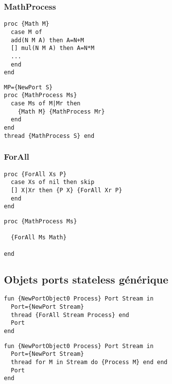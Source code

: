 \documentclass{report}
\begin{document}
\subsubsection*{MathProcess}
\begin{minipage}[t]{0.45\linewidth}
\begin{lstlisting}[escapechar=\%]
proc {Math M} 
  case M of 
  add(N M A) then A=N+M 
  [] mul(N M A) then A=N*M 
  ... 
  end
end
\end{lstlisting} 
\end{minipage}
%
\begin{minipage}[t]{0.45\linewidth}
\begin{lstlisting}[escapechar=\%]
MP={NewPort S} 
proc {MathProcess Ms} 
  case Ms of M|Mr then 
    {Math M} {MathProcess Mr}
  end
end
thread {MathProcess S} end
\end{lstlisting}
\end{minipage}

\subsubsection*{ForAll}
\begin{minipage}[t]{0.45\linewidth}
\begin{lstlisting}[escapechar=\%]
proc {ForAll Xs P} 
  case Xs of nil then skip 
  [] X|Xr then {P X} {ForAll Xr P} 
  end
end
\end{lstlisting}
\end{minipage}
%
\begin{minipage}[t]{0.45\linewidth}
\begin{lstlisting}[escapechar=\%]
proc {MathProcess Ms} 

  {ForAll Ms Math} 

end
\end{lstlisting}
\end{minipage}

\subsection{Objets ports stateless générique}
\begin{lstlisting}[escapechar=\%]
fun {NewPortObject0 Process} Port Stream in
  Port={NewPort Stream} 
  thread {ForAll Stream Process} end 
  Port
end
\end{lstlisting}

\begin{lstlisting}[escapechar=\%]
fun {NewPortObject0 Process} Port Stream in
  Port={NewPort Stream} 
  thread for M in Stream do {Process M} end end 
  Port
end
\end{lstlisting}
\end{document}

